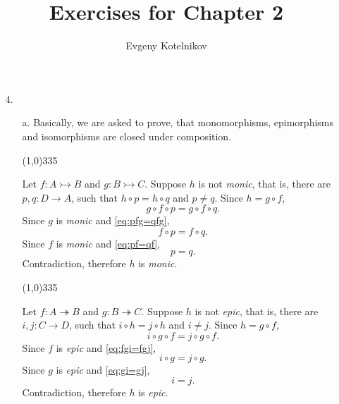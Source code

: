 \documentclass[12pt]{article}
\author{Evgeny Kotelnikov}
\title{Exercises for Chapter 2}
\date{}
\begin{document}
\maketitle

\begin{enumerate}

  \item[4.]
    \begin{enumerate}
      \item[a.]
        Basically, we are asked to prove, that monomorphisms, epimorphisms and isomorphisms are closed under composition.

        \begin{center}
          \vspace{-1.75em}\line(1,0){335}
        \end{center}

        Let $f : A \rightarrowtail B$ and $g : B \rightarrowtail C$. Suppose $h$ is not \emph{monic}, that is, there are $p, q : D \to A$, such that $h \circ p = h \circ q$ and $p \neq q$. Since $h = g \circ f$,
        \begin{equation}
          \label{eq:pfg=qfg}
          g \circ f \circ p = g \circ f \circ q.
        \end{equation}
        Since $g$ is \emph{monic} and \ref{eq:pfg=qfg},
        \begin{equation}
          \label{eq:pf=qf}
          f \circ p = f \circ q.
        \end{equation}
        Since $f$ is \emph{monic} and \ref{eq:pf=qf},
        \begin{equation*}
          p = q.
        \end{equation*}
        Contradiction, therefore $h$ is \emph{monic}.

        \begin{center}
          \vspace{-1.75em}\line(1,0){335}
        \end{center}

        Let $f : A \twoheadrightarrow B$ and $g : B \twoheadrightarrow C$. Suppose $h$ is not \emph{epic}, that is, there are $i, j : C \to D$, such that $i \circ h = j \circ h$ and $i \neq j$. Since $h = g \circ f$,
        \begin{equation}
          \label{eq:fgi=fgj}
          i \circ g \circ f = j \circ g \circ f.
        \end{equation}
        Since $f$ is \emph{epic} and \ref{eq:fgi=fgj},
        \begin{equation}
          \label{eq:gi=gj}
          i \circ g = j \circ g.
        \end{equation}
        Since $g$ is \emph{epic} and \ref{eq:gi=gj},
        \begin{equation*}
          i = j.
        \end{equation*}
        Contradiction, therefore $h$ is \emph{epic}.


\end{enumerate}
\end{enumerate}
\end{document}
